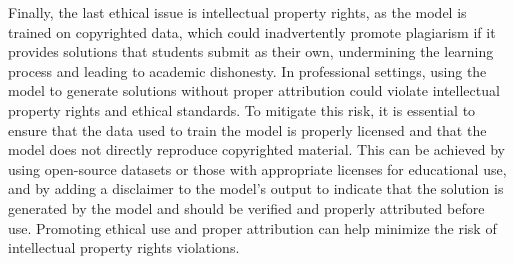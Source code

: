 \documentclass{article}
\begin{document}
Finally, the last ethical issue is intellectual property rights, as the model is trained on copyrighted data, which could inadvertently promote plagiarism if it provides solutions that students submit as their own, undermining the learning process and leading to academic dishonesty. In professional settings, using the model to generate solutions without proper attribution could violate intellectual property rights and ethical standards. To mitigate this risk, it is essential to ensure that the data used to train the model is properly licensed and that the model does not directly reproduce copyrighted material. This can be achieved by using open-source datasets or those with appropriate licenses for educational use, and by adding a disclaimer to the model's output to indicate that the solution is generated by the model and should be verified and properly attributed before use. Promoting ethical use and proper attribution can help minimize the risk of intellectual property rights violations.





\end{document}
